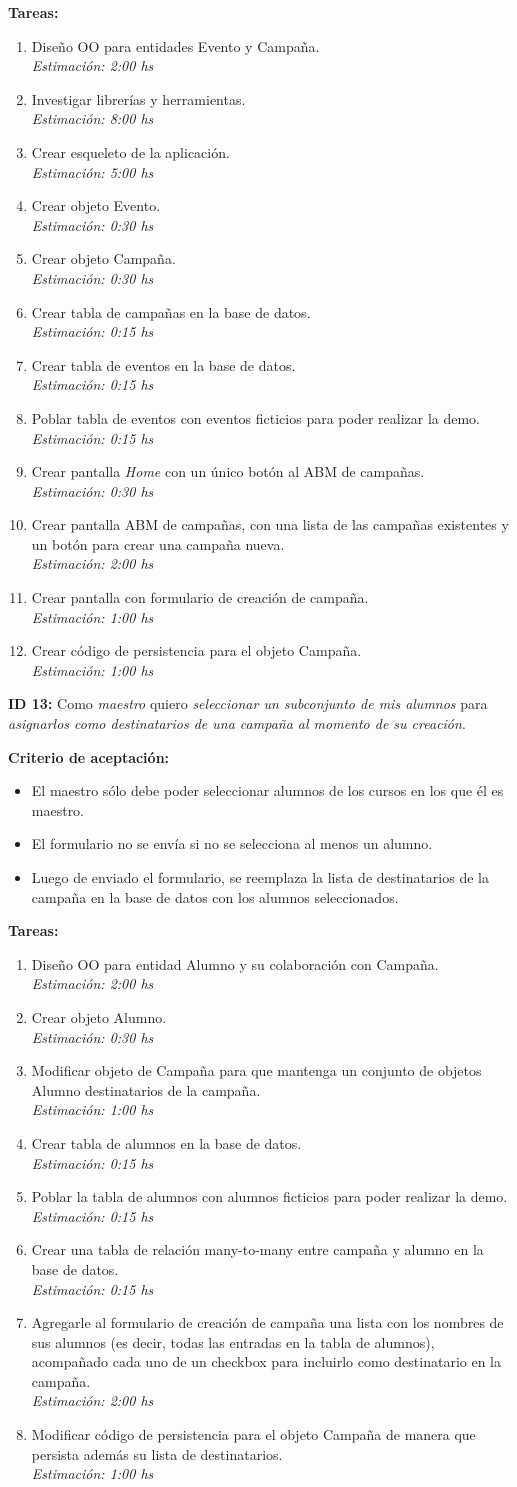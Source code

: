 \documentclass[a4paper, 10pt, twoside]{article}
\newcommand{\sprintstory}[4]{
  \noindent
  \textbf{ID #1:} Como \emph{#2} quiero \emph{#3} para \emph{#4}.
}
\newenvironment{criterios}{
  \textbf{Criterio de aceptación:}
  \begin{itemize}
}{
  \end{itemize}
}
\newcommand{\criterio}[1] {
  \item #1
}
\newenvironment{tasks}{
  \textbf{Tareas:}
  \begin{enumerate}
}{
  \end{enumerate}
}
\newcommand{\task}[2] {
  \item #1.\\
  \emph{Estimación: #2 hs}
}
\begin{document}
\begin{tasks}
  \task{Diseño OO para entidades Evento y Campaña}{2:00}
  \task{Investigar librerías y herramientas}{8:00}
  \task{Crear esqueleto de la aplicación}{5:00}
  \task{Crear objeto Evento}{0:30}
  \task{Crear objeto Campaña}{0:30}
  \task{Crear tabla de campañas en la base de datos}{0:15}
  \task{Crear tabla de eventos en la base de datos}{0:15}
  \task{Poblar tabla de eventos con eventos ficticios para poder realizar la demo}{0:15}
  \task{Crear pantalla \emph{Home} con un único botón al ABM de campañas}{0:30}
  \task{Crear pantalla ABM de campañas, con una lista de las campañas existentes y un botón para crear una campaña nueva}{2:00}
  \task{Crear pantalla con formulario de creación de campaña}{1:00}
  \task{Crear código de persistencia para el objeto Campaña}{1:00}
\end{tasks}


\sprintstory{13}
            {maestro}
            {seleccionar un subconjunto de mis alumnos}
            {asignarlos como destinatarios de una campaña al momento de su creación}

\begin{criterios}
  \criterio{El maestro sólo debe poder seleccionar alumnos de los cursos en los que él es maestro.}
  \criterio{El formulario no se envía si no se selecciona al menos un alumno.}
  \criterio{Luego de enviado el formulario, se reemplaza la lista de destinatarios de la campaña en la base de datos con los alumnos seleccionados.}
\end{criterios}

\begin{tasks}
  \task{Diseño OO para entidad Alumno y su colaboración con Campaña}{2:00}
  \task{Crear objeto Alumno}{0:30}
  \task{Modificar objeto de Campaña para que mantenga un conjunto de objetos Alumno destinatarios de la campaña}{1:00}
  \task{Crear tabla de alumnos en la base de datos}{0:15}
  \task{Poblar la tabla de alumnos con alumnos ficticios para poder realizar la demo}{0:15}
  \task{Crear una tabla de relación many-to-many entre campaña y alumno en la base de datos}{0:15}
  \task{Agregarle al formulario de creación de campaña una lista con los nombres de sus alumnos (es decir, todas las entradas en la tabla de alumnos), acompañado cada uno de un checkbox para incluirlo como destinatario en la campaña}{2:00}
  \task{Modificar código de persistencia para el objeto Campaña de manera que persista además su lista de destinatarios}{1:00}
\end{tasks}
\end{document}
